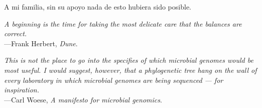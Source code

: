 %
\begin{frontmatter}

%
%
\makefrontmatter 

%
%   
%
%
%
%
\begin{dedication} 
  A mi familia, sin su apoyo nada de esto hubiera sido posible.    
\end{dedication}


%   
% 



%
%
\begin{epigraph} %
  \emph{A beginning is the time for taking the most delicate care that the balances are correct.}\\
  ---Frank Herbert, \textit{Dune}.

  \emph{This is not the place to go into the specifies of which microbial genomes would be most useful. I would suggest, however, that a phylogenetic tree hang on the wall of every laboratory in which microbial genomes are being sequenced — for inspiration.}\\
  ---Carl Woese, \textit{A manifesto for microbial genomics}.
  


\end{epigraph}
\end{frontmatter}
